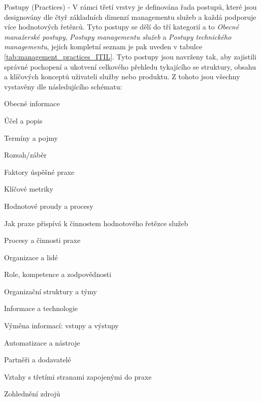 \documentclass[
  digital,     %
  twoside,     %
  lof,         %
  lot,         %
]{fithesis4}
\begin{document}
\begin{compactitem}
    \item Postupy (Practices) - V rámci třetí vrstvy je definována řada postupů, které jsou designovány dle čtyř základních dimenzí managementu služeb a každá podporuje více hodnotových řetězců. Tyto postupy se dělí do tří kategorií a to \emph{Obecné manažerské postupy}, \emph{Postupy managementu služeb} a \emph{Postupy technického managementu}, jejich kompletní seznam je pak uveden v tabulce \ref{tab:management_practices_ITIL}.
    Tyto postupy jsou navrženy tak, aby zajistili správné pochopení a ukotvení celkového přehledu tykajícího se struktury, obsahu a klíčových konceptů uživateli služby nebo produktu. Z tohoto jsou všechny vystavěny dle následujícího schématu: \parencite[s.~23]{Cartlidge2020}
    \begin{compactitem}
        \item Obecné informace
        \begin{compactitem}
            \item Účel a popis
            \item Termíny a pojmy
            \item Rozsah/záběr
            \item Faktory úspěšné praxe
            \item Klíčové metriky
        \end{compactitem}
        \item Hodnotové proudy a procesy
        \begin{compactitem}
            \item Jak praxe přispívá k činnostem hodnotového řetězce služeb
            \item Procesy a činnosti praxe
        \end{compactitem}
        \item Organizace a lidé
            \begin{compactitem}
                \item Role, kompetence a zodpovědnosti
                \item Organizační struktury a týmy
            \end{compactitem}
        \item Informace a technologie
        \begin{compactitem}
            \item Výměna informací: vstupy a výstupy
            \item Automatizace a nástroje
        \end{compactitem}
        \item Partněři a dodavatelé
        \begin{compactitem}
            \item Vztahy s třetími stranami zapojenými do praxe
            \item Zohlednění zdrojů
        \end{compactitem}
    \end{compactitem}
    

\end{compactitem}
\end{document}
